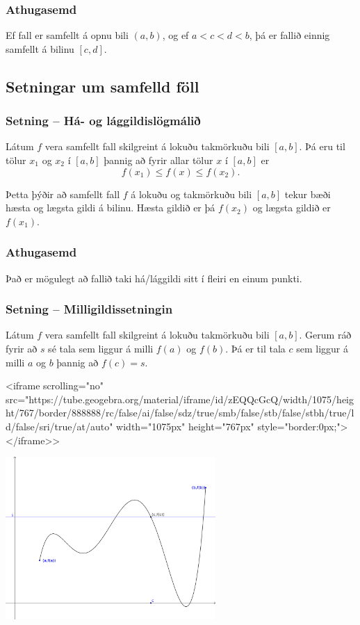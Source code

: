 \documentclass[icelandic,a4paper,12pt]{article}
\begin{document}
\pause
\subsubsection{Athugasemd}
Ef fall er samfellt á opnu bili $(a,b)$, og ef $a<c<d<b$, þá er fallið einnig samfellt á bilinu $[c,d]$.

\subsection{Setningar um samfelld föll}
\subsubsection{Setning -- Há- og lággildislögmálið}
Látum $f$ vera samfellt fall skilgreint á lokuðu takmörkuðu bili
$[a,b]$.  Þá eru til tölur $x_1$ og $x_2$ í $[a,b]$ þannig að 
fyrir allar tölur $x$ í $[a,b]$ er $$f(x_1)\leq f(x)\leq f(x_2).$$

Þetta þýðir að samfellt fall $f$ á lokuðu og takmörkuðu
bili $[a,b]$ tekur bæði hæsta og lægsta gildi á bilinu. \pause
Hæsta
gildið er þá $f(x_2)$ og lægsta gildið er $f(x_1)$.
 
\subsubsection{Athugasemd}
Það er mögulegt að fallið taki há/lággildi sitt í fleiri en einum punkti.

\subsubsection{Setning -- Milligildissetningin}
Látum $f$ vera samfellt fall skilgreint á lokuðu takmörkuðu bili
$[a,b]$.  Gerum ráð fyrir að $s$ sé tala sem liggur á milli $f(a)$ og
$f(b)$.  Þá er til tala $c$ sem liggur á milli $a$ og $b$ þannig að
$f(c)=s$. 
 
<iframe scrolling="no" src="https://tube.geogebra.org/material/iframe/id/zEQQcGcQ/width/1075/height/767/border/888888/rc/false/ai/false/sdz/true/smb/false/stb/false/stbh/true/ld/false/sri/true/at/auto" width="1075px" height="767px" style="border:0px;"> </iframe>>
\begin{center}
 \includegraphics[width=8cm,keepaspectratio=true]{./myndir/kafli01/04_Milligildissetn.png}
\end{center}
\end{document}
